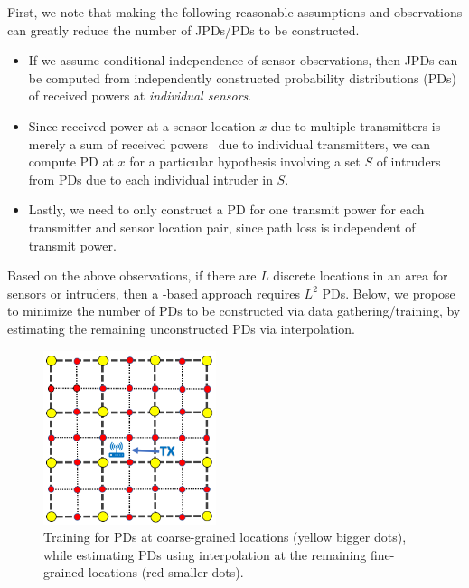   First, we note that making the
following reasonable assumptions and observations can greatly reduce
the number of JPDs/PDs to be constructed.
\begin{itemize}
  \item
If we assume conditional independence of sensor observations, then
JPDs can be computed from independently constructed probability
distributions (PDs) of received powers at {\em individual sensors}.

\item
  Since received power at a sensor location $x$ due to multiple
  transmitters is merely a sum of received powers~\cite{rappaport-2001,mobicom17-splot} due to individual
  transmitters, we can compute PD at $x$ for a particular hypothesis
  involving a set $S$ of intruders from PDs due to each individual
  intruder in $S$.

\item
  Lastly, we need to only construct a PD for one transmit power for
  each transmitter and sensor location pair, since path loss is
  independent of transmit power.
\end{itemize}
Based on the above observations, if there are $L$ discrete locations
in an area for sensors or intruders, then a \mll-based approach
requires $L^2$ PDs. Below, we propose to minimize the number of PDs to
be constructed via data gathering/training, by estimating the
remaining unconstructed PDs via interpolation.


\begin{figure}
  \center
  \includegraphics[width=0.45\textwidth]{chapters/ipsn/figures/multi-granular.png}
  \caption{Training for PDs at coarse-grained locations (yellow bigger
          dots), while estimating PDs using interpolation at the remaining
          fine-grained locations (red smaller dots).}
  \label{fig:path-loss}
\end{figure}

